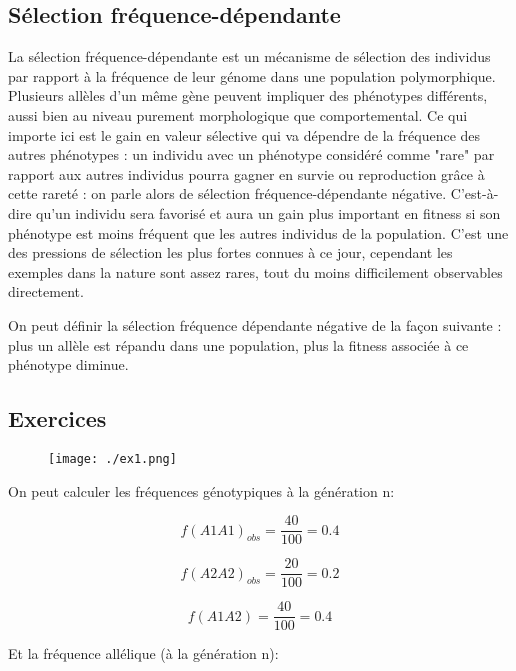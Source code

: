 \documentclass{article}
\begin{document}
\subsection{Sélection fréquence-dépendante}

La sélection fréquence-dépendante est un mécanisme de sélection des individus par rapport à la fréquence de leur génome dans une population polymorphique. Plusieurs allèles d'un même gène peuvent impliquer des phénotypes différents, aussi bien au niveau purement morphologique que comportemental. Ce qui importe ici est le gain en valeur sélective qui va dépendre de la fréquence des autres phénotypes : un individu avec un phénotype considéré comme "rare" par rapport aux autres individus pourra gagner en survie ou reproduction grâce à cette rareté : on parle alors de sélection fréquence-dépendante négative. C'est-à-dire qu'un individu sera favorisé et aura un gain plus important en fitness si son phénotype est moins fréquent que les autres individus de la population. C'est une des pressions de sélection les plus fortes connues à ce jour, cependant les exemples dans la nature sont assez rares, tout du moins difficilement observables directement.

On peut définir la sélection fréquence dépendante négative de la façon suivante : plus un allèle est répandu dans une population, plus la fitness associée à ce phénotype diminue.

\subsection{Exercices}

\begin{figure}[H]
\texttt{[image: ./ex1.png]}
\end{figure}

On peut calculer les fréquences génotypiques à la génération n:

\begin{equation}
f(A1A1)_{obs} = \frac{40}{100} = 0.4
\end{equation}

\begin{equation}
f(A2A2)_{obs} = \frac{20}{100} = 0.2
\end{equation}

\begin{equation}
f(A1A2) = \frac{40}{100} = 0.4
\end{equation}

Et la fréquence allélique (à la génération n):
\end{document}
